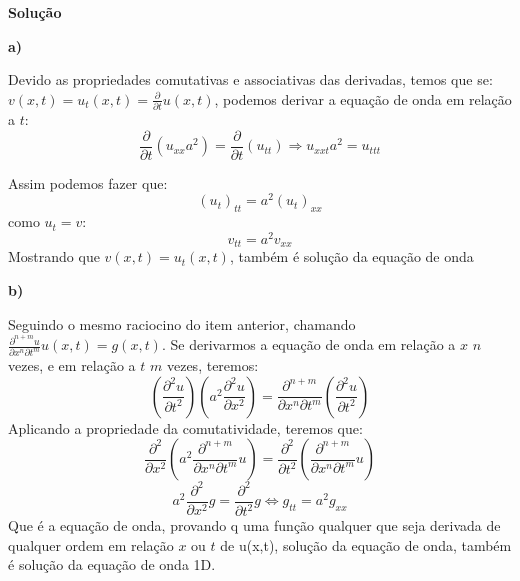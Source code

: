 \linespread{1.5}

\textbf{Solução}

\textbf{a)}

Devido as propriedades comutativas e associativas das derivadas, temos que se: $v(x,t) = u_t(x, t) = \frac{\partial }{\partial t}u(x,t)$, podemos derivar a equação de onda em relação a $t$:
\begin{equation*}
    \frac{\partial }{\partial t}(u_{xx}a^2) = \frac{\partial }{\partial t}(u_{tt}) \Rightarrow u_{xxt}a^2 = u_{ttt}
\end{equation*}

Assim podemos fazer que:
\begin{equation*}
    (u_t)_{tt} = a^2(u_t)_{xx}
\end{equation*}
como $u_t = v$:
\begin{equation*}
    v_{tt} = a^2v_{xx}
\end{equation*}
Mostrando que $v(x,t) = u_t(x,t)$, também é solução da equação de onda 

\textbf{b)}

Seguindo o mesmo raciocino do item anterior, chamando $\frac{\partial^{n+m} u}{\partial x^n\partial t^m}u(x,t) = g(x,t)$. Se derivarmos a equação de onda em relação a $x$ $n$ vezes, e em relação a $t$ $m$ vezes, teremos:
\begin{equation*}
    (\frac{\partial^2 u}{\partial t^2})(a^2 \frac{\partial^2 u}{\partial x^2}) = \frac{\partial^{n+m} }{\partial x^n\partial t^m }(\frac{\partial^2 u}{\partial t^2})
\end{equation*}
Aplicando a propriedade da comutatividade, teremos que:
\begin{equation*}
    \frac{\partial^2 }{\partial x^2} (a^2 \frac{\partial^{n+m} }{\partial x^n\partial t^m}u) = \frac{\partial^2}{\partial t^2}(\frac{\partial^{n+m} }{\partial x^n\partial t^m}u)
\end{equation*}
\begin{equation*}
    a^2 \frac{\partial^2 }{\partial x^2}g = \frac{\partial^2}{\partial t^2}g \Leftrightarrow g_{tt} = a^2g_{xx} 
\end{equation*}
Que é a equação de onda, provando q uma função qualquer que seja derivada de qualquer ordem em relação $x$ ou $t$ de u(x,t), solução da equação de onda, também é solução da equação de onda 1D.


